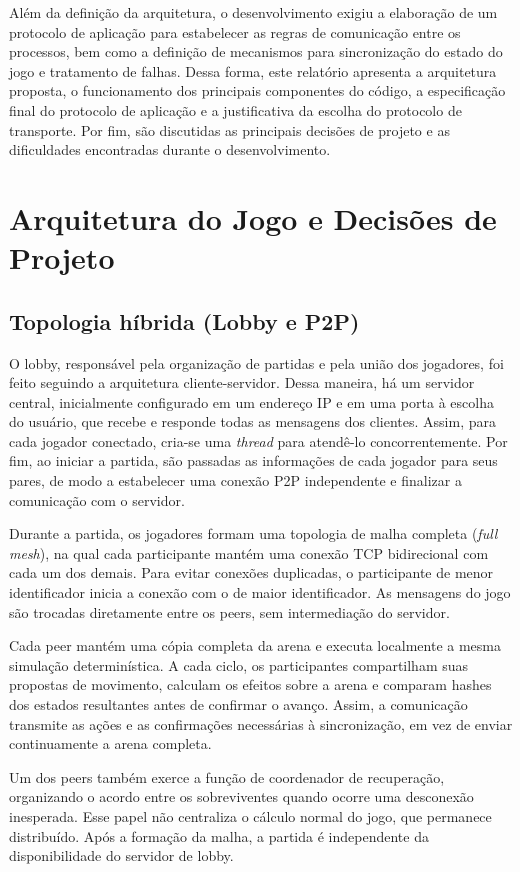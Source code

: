 \documentclass[11pt,a4paper]{article}
\begin{document}
Além da definição da arquitetura, o desenvolvimento exigiu a elaboração de um protocolo de aplicação para estabelecer as regras de comunicação entre os processos, bem como a definição de mecanismos para sincronização do estado do jogo e tratamento de falhas. Dessa forma, este relatório apresenta a arquitetura proposta, o funcionamento dos principais componentes do código, a especificação final do protocolo de aplicação e a justificativa da escolha do protocolo de transporte. Por fim, são discutidas as principais decisões de projeto e as dificuldades encontradas durante o desenvolvimento.

\section{Arquitetura do Jogo e Decisões de Projeto}
\subsection{Topologia híbrida (Lobby e P2P)}
O lobby, responsável pela organização de partidas e pela união dos jogadores, foi feito seguindo a arquitetura cliente-servidor. Dessa maneira, há um servidor central, inicialmente configurado em um endereço IP e em uma porta à escolha do usuário, que recebe e responde todas as mensagens dos clientes. Assim, para cada jogador conectado, cria-se uma \textit{thread} para atendê-lo concorrentemente. Por fim, ao iniciar a partida, são passadas as informações de cada jogador para seus pares, de modo a estabelecer uma conexão P2P independente e finalizar a comunicação com o servidor.

Durante a partida, os jogadores formam uma topologia de malha completa (\textit{full mesh}), na qual cada participante mantém uma conexão TCP bidirecional com cada um dos demais. Para evitar conexões duplicadas, o participante de menor identificador inicia a conexão com o de maior identificador. As mensagens do jogo são trocadas diretamente entre os peers, sem intermediação do servidor.

Cada peer mantém uma cópia completa da arena e executa localmente a mesma simulação determinística. A cada ciclo, os participantes compartilham suas propostas de movimento, calculam os efeitos sobre a arena e comparam hashes dos estados resultantes antes de confirmar o avanço. Assim, a comunicação transmite as ações e as confirmações necessárias à sincronização, em vez de enviar continuamente a arena completa.

Um dos peers também exerce a função de coordenador de recuperação, organizando o acordo entre os sobreviventes quando ocorre uma desconexão inesperada. Esse papel não centraliza o cálculo normal do jogo, que permanece distribuído. Após a formação da malha, a partida é independente da disponibilidade do servidor de lobby.
\end{document}
